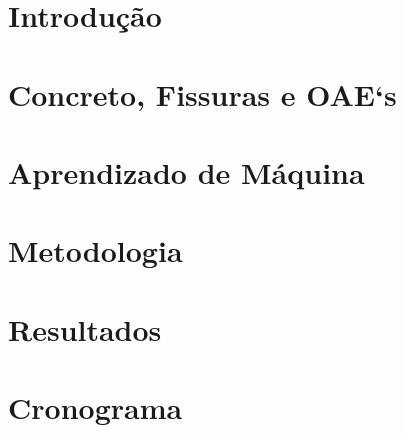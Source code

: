 \documentclass[tcc2, pos-defesa, english, brazil]{packages/ufgrc}
\begin{document}
\textual

\chapter{Introdução}
\label{chapter:introducao}


\chapter{Concreto, Fissuras e OAE`s}
\label{chapter:concreto}


\chapter{Aprendizado de Máquina}
\label{chapter:deep_learn}


\chapter{Metodologia}
\label{chapter:metodologia}


\chapter{Resultados}
\label{chapter:resultados}


\chapter{Cronograma} %
\label{chapter:conclusao}


% 

\postextual



\end{document}
